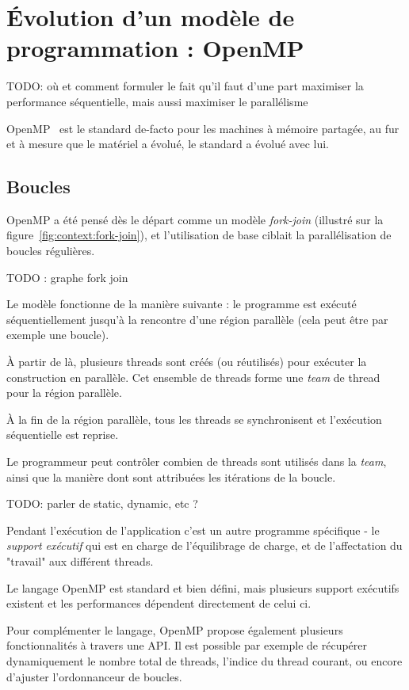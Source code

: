 \section{Évolution d'un modèle de programmation : OpenMP}\label{sec:context:openmp}

TODO: où et comment formuler le fait qu'il faut d'une part maximiser la performance séquentielle, mais aussi maximiser le parallélisme

OpenMP~\cite{openmp45} est le standard de-facto pour les machines à mémoire partagée, au fur et à mesure que le matériel a évolué, le standard a évolué avec lui.

\subsection{Boucles}

OpenMP a été pensé dès le départ comme un modèle \emph{fork-join} (illustré sur la figure~\ref{fig:context:fork-join}), et l'utilisation de base ciblait la parallélisation de boucles régulières.

\label{fig:context:fork-join}TODO : graphe fork join

Le modèle fonctionne de la manière suivante : le programme est exécuté séquentiellement jusqu'à la rencontre d'une région parallèle (cela peut être par exemple une boucle).

À partir de là, plusieurs threads sont créés (ou réutilisés) pour exécuter la construction en parallèle. Cet ensemble de threads forme une \emph{team} de thread pour la région parallèle.

À la fin de la région parallèle, tous les threads se synchronisent et l'exécution séquentielle est reprise.

Le programmeur peut contrôler combien de threads sont utilisés dans la \emph{team}, ainsi que la manière dont sont attribuées les itérations de la boucle.

TODO: parler de static, dynamic, etc ?

Pendant l'exécution de l'application c'est un autre programme spécifique - le \emph{support exécutif} qui est en charge de l'équilibrage de charge, et de l'affectation du "travail" aux différent threads.

Le langage OpenMP est standard et bien défini, mais plusieurs support exécutifs existent et les performances dépendent directement de celui ci.

Pour complémenter le langage, OpenMP propose également plusieurs fonctionnalités à travers une API. Il est possible par exemple de récupérer dynamiquement le nombre total de threads, l'indice du thread courant, ou encore d'ajuster l'ordonnanceur de boucles.


